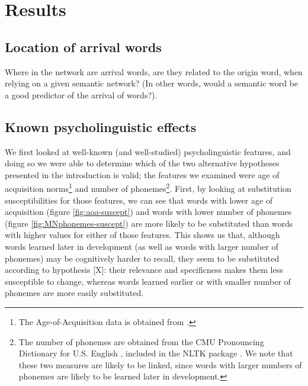 \section{Results}\label{sec:results}



\subsection{Location of arrival words} 

Where in the network are arrival words, are they related to the origin word, when relying on a given semantic network?  (In other words, would a semantic word be a good predictor of the arrival of words?). 


\subsection{Known psycholinguistic effects}

We first looked at well-known (and well-studied) psycholinguistic features, and doing so we were able to determine which of the two alternative hypotheses presented in the introduction is valid; the features we examined were age of acquisition norms\footnote{The Age-of-Acquisition data is obtained from \citet{Kuperman12}.} and number of phonemes\footnote{The number of phonemes are obtained from the CMU Pronouncing Dictionary for U.S. English \citep{Weide98}, included in the NLTK package \citep{Bird09}. We note that these two measures are likely to be linked, since words with larger numbers of phonemes are likely to be learned later in development.}. First, by looking at substitution susceptibilities for those features, we can see that words with lower age of acquisition (figure \ref{fig:aoa-suscept}) and words with lower number of phonemes (figure \ref{fig:MNphonemes-suscept}) are more likely to be substituted than words with higher values for either of those features. This shows us that, although words learned later in development (as well as words with larger number of phonemes) may be cognitively harder to recall, they seem to be substituted according to hypothesis [X]: their relevance and specificness makes them less susceptible to change, whereas words learned earlier or with smaller number of phonemes are more easily substituted.

